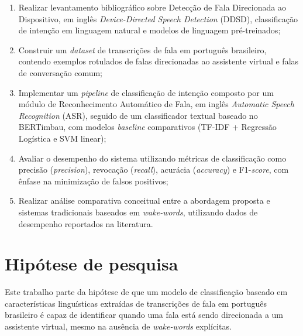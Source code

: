 \documentclass[
    12pt,                %
    openright,           %
    oneside,             %
    a4paper,             %
    english,             %
    brazil               %
]{abntex2}
\begin{document}
\begin{enumerate}
    \item Realizar levantamento bibliográfico sobre Detecção de Fala Direcionada ao Dispositivo, em inglês \textit{Device-Directed Speech Detection} (DDSD), classificação de intenção em linguagem natural e modelos de linguagem pré-treinados;
    \item Construir um \textit{dataset} de transcrições de fala em português brasileiro, contendo exemplos rotulados de falas direcionadas ao assistente virtual e falas de conversação comum;
    \item Implementar um \textit{pipeline} de classificação de intenção composto por um módulo de Reconhecimento Automático de Fala, em inglês \textit{Automatic Speech Recognition} (ASR), seguido de um classificador textual baseado no BERTimbau, com modelos \textit{baseline} comparativos (TF-IDF + Regressão Logística e SVM linear);
    \item Avaliar o desempenho do sistema utilizando métricas de classificação como precisão (\textit{precision}), revocação (\textit{recall}), acurácia (\textit{accuracy}) e F1-\textit{score}, com ênfase na minimização de falsos positivos;
    \item Realizar análise comparativa conceitual entre a abordagem proposta e sistemas tradicionais baseados em \textit{wake-words}, utilizando dados de desempenho reportados na literatura.
\end{enumerate}

\section{Hipótese de pesquisa}
\label{sec:hipotese}

Este trabalho parte da hipótese de que um modelo de classificação baseado em características linguísticas extraídas de transcrições de fala em português brasileiro é capaz de identificar quando uma fala está sendo direcionada a um assistente virtual, mesmo na ausência de \textit{wake-words} explícitas.

\end{document}
